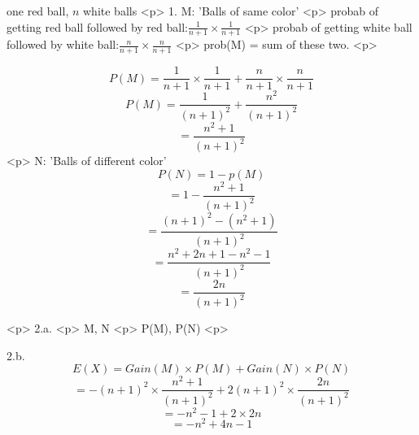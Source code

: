one red ball, $n$ white balls
<p>
1. M: 'Balls of same color'
<p>
probab of getting red ball followed by red ball:$ \frac{1}{n+1} \times \frac{1}{n+1}$
<p>
probab of getting white ball followed by white ball:$ \frac{n}{n+1} \times \frac{n}{n+1}$
<p>
prob(M) = sum of these two.
<p>

$$P(M) = \frac{1}{n+1} \times \frac{1}{n+1}  +  \frac{n}{n+1} \times \frac{n}{n+1}  $$
$$P(M) = \frac{1}{(n+1)^2}  +  \frac{n^2}{(n+1)^2}$$
$$ = \frac{n^2+1}{(n+1)^2}$$
<p>
 N: 'Balls of different color'
 $$P(N) = 1- p(M)$$
 $$ = 1-\frac{n^2+1}{(n+1)^2}$$ 
 $$ = \frac{(n+1)^2-(n^2+1)}{(n+1)^2}$$ 
 $$ = \frac{n^2 + 2n + 1 - n^2 -1}{(n+1)^2}$$ 
 $$ = \frac{2n}{(n+1)^2}$$ 

 <p>
 2.a.
 <p>
 M, N
 <p>
 P(M), P(N)
 <p>

 2.b.
$$E(X) = Gain(M) \times P(M) + Gain(N) \times P(N)$$
$$ =-(n+1)^2 \times \frac{n^2+1}{(n+1)^2} +  2(n+1)^2 \times \frac{2n}{(n+1)^2}$$ 
$$ =-n^2-1 +  2 \times 2n$$ 
$$ =-n^2+4n-1$$

 
